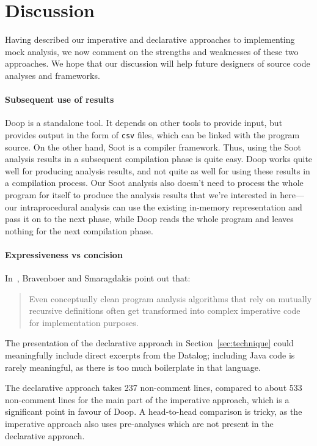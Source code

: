 \section{Discussion}
\label{sec:discussion}

Having described our imperative and declarative approaches to implementing mock analysis, we now comment on the strengths and weaknesses of these two approaches. We hope that our discussion will help future designers of source code analyses and frameworks.

\paragraph{Subsequent use of results} Doop is a standalone tool. It depends on other tools to provide input, but provides output in the form of \texttt{csv} files, which can be linked with the program source. On the other hand, Soot is a compiler framework. Thus, using the Soot analysis results in a subsequent compilation phase is quite easy. Doop works quite well for producing analysis results, and not quite as well for using these results in a compilation process. Our Soot analysis also doesn't need to process the whole program for itself to produce the analysis results that we're interested in here---our intraprocedural analysis can use the existing in-memory representation and pass it on to the next phase, while Doop reads the whole program and leaves nothing for the next compilation phase. 

\paragraph{Expressiveness vs concision} In~\cite{bravenboer09:_stric_declar_specif_sophis_point_analy}, Bravenboer and Smaragdakis point out that:
\begin{quote}
Even conceptually clean program analysis algorithms that
rely on mutually recursive definitions often get transformed
into complex imperative code for implementation purposes.
\end{quote}
The presentation of the declarative approach in Section~\ref{sec:technique} could meaningfully include direct excerpts from the Datalog; including Java code is rarely meaningful, as there is too much boilerplate in that language.

The declarative approach takes 237 non-comment lines, compared to about 533 non-comment lines for the main part of the imperative approach, which is a significant point in favour of Doop. A head-to-head comparison is tricky, as the imperative approach also uses pre-analyses which are not present in the declarative approach.

